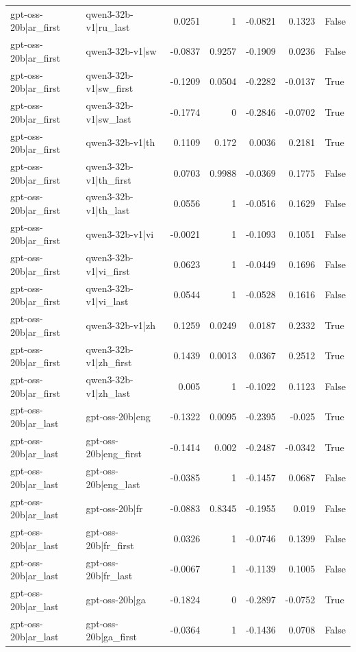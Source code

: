\begin{table}
\begin{tabular}{l l r r r r l}
gpt-oss-20b|ar_first & qwen3-32b-v1|ru_last & 0.0251 & 1 & -0.0821 & 0.1323 & False \\
gpt-oss-20b|ar_first & qwen3-32b-v1|sw & -0.0837 & 0.9257 & -0.1909 & 0.0236 & False \\
gpt-oss-20b|ar_first & qwen3-32b-v1|sw_first & -0.1209 & 0.0504 & -0.2282 & -0.0137 & True \\
gpt-oss-20b|ar_first & qwen3-32b-v1|sw_last & -0.1774 & 0 & -0.2846 & -0.0702 & True \\
gpt-oss-20b|ar_first & qwen3-32b-v1|th & 0.1109 & 0.172 & 0.0036 & 0.2181 & True \\
gpt-oss-20b|ar_first & qwen3-32b-v1|th_first & 0.0703 & 0.9988 & -0.0369 & 0.1775 & False \\
gpt-oss-20b|ar_first & qwen3-32b-v1|th_last & 0.0556 & 1 & -0.0516 & 0.1629 & False \\
gpt-oss-20b|ar_first & qwen3-32b-v1|vi & -0.0021 & 1 & -0.1093 & 0.1051 & False \\
gpt-oss-20b|ar_first & qwen3-32b-v1|vi_first & 0.0623 & 1 & -0.0449 & 0.1696 & False \\
gpt-oss-20b|ar_first & qwen3-32b-v1|vi_last & 0.0544 & 1 & -0.0528 & 0.1616 & False \\
gpt-oss-20b|ar_first & qwen3-32b-v1|zh & 0.1259 & 0.0249 & 0.0187 & 0.2332 & True \\
gpt-oss-20b|ar_first & qwen3-32b-v1|zh_first & 0.1439 & 0.0013 & 0.0367 & 0.2512 & True \\
gpt-oss-20b|ar_first & qwen3-32b-v1|zh_last & 0.005 & 1 & -0.1022 & 0.1123 & False \\
gpt-oss-20b|ar_last & gpt-oss-20b|eng & -0.1322 & 0.0095 & -0.2395 & -0.025 & True \\
gpt-oss-20b|ar_last & gpt-oss-20b|eng_first & -0.1414 & 0.002 & -0.2487 & -0.0342 & True \\
gpt-oss-20b|ar_last & gpt-oss-20b|eng_last & -0.0385 & 1 & -0.1457 & 0.0687 & False \\
gpt-oss-20b|ar_last & gpt-oss-20b|fr & -0.0883 & 0.8345 & -0.1955 & 0.019 & False \\
gpt-oss-20b|ar_last & gpt-oss-20b|fr_first & 0.0326 & 1 & -0.0746 & 0.1399 & False \\
gpt-oss-20b|ar_last & gpt-oss-20b|fr_last & -0.0067 & 1 & -0.1139 & 0.1005 & False \\
gpt-oss-20b|ar_last & gpt-oss-20b|ga & -0.1824 & 0 & -0.2897 & -0.0752 & True \\
gpt-oss-20b|ar_last & gpt-oss-20b|ga_first & -0.0364 & 1 & -0.1436 & 0.0708 & False \\

\end{tabular}
\end{table}
